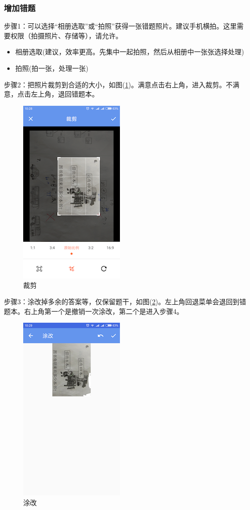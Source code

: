 \subsubsection{增加错题}
步骤1：可以选择“相册选取”或“拍照”获得一张错题照片。建议手机横拍。这里需要权限（拍摄照片、存储等），请允许。
\begin{itemize}
	\item 相册选取(建议，效率更高。先集中一起拍照，然后从相册中一张张选择处理)
	\item 拍照(拍一张，处理一张)
\end{itemize}

步骤2：把照片裁剪到合适的大小，如图(\ref{img20})。满意点击右上角\Checkmark ，进入裁剪。不满意，点击左上角\XSolid ，退回错题本。

\begin{figure}[H]
	\centering
	\includegraphics{img/20.png}
	\caption{裁剪}
	\label{img20}
\end{figure}

步骤3：涂改掉多余的答案等，仅保留题干，如图(\ref{img21})。左上角回退菜单会退回到错题本。右上角第一个是撤销一次涂改，第二个是进入步骤4。
\begin{figure}[H]
	\centering
	\includegraphics{img/21.png}
	\caption{涂改}
	\label{img21}
\end{figure}

